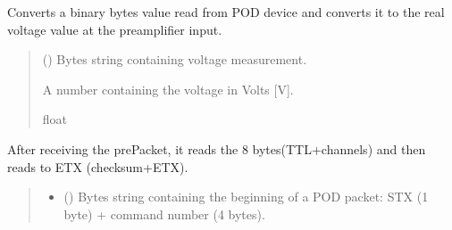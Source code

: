 \documentclass[letterpaper,10pt,english]{sphinxmanual}
\begin{document}
\begin{fulllineitems}
\begin{fulllineitems}
\label{\detokenize{PodDevice_8206HR:PodDevice_8206HR.POD_8206HR._BinaryBytesToVoltage}}
\pysigstartsignatures
{}
\pysigstopsignatures
\sphinxAtStartPar
Converts a binary bytes value read from POD device and converts it to the real voltage value         at the preamplifier input.
\begin{quote}\begin{description}
\sphinxAtStartPar
{} () \textendash{} Bytes string containing voltage measurement.

\sphinxAtStartPar
A number containing the voltage in Volts {[}V{]}.

\sphinxAtStartPar
float

\end{description}\end{quote}

\end{fulllineitems}


\begin{fulllineitems}
\label{\detokenize{PodDevice_8206HR:PodDevice_8206HR.POD_8206HR._Read_Binary}}
\pysigstartsignatures
{}
\pysigstopsignatures
\sphinxAtStartPar
After receiving the prePacket, it reads the 8 bytes(TTL+channels) and then reads to ETX         (checksum+ETX).
\begin{quote}\begin{description}
\begin{itemize}
\item {} 
\sphinxAtStartPar
{} () \textendash{} Bytes string containing the beginning of a POD packet: STX (1 byte)                 + command number (4 bytes).


\end{itemize}
\end{description}
\end{quote}
\end{fulllineitems}
\end{fulllineitems}
\end{document}
